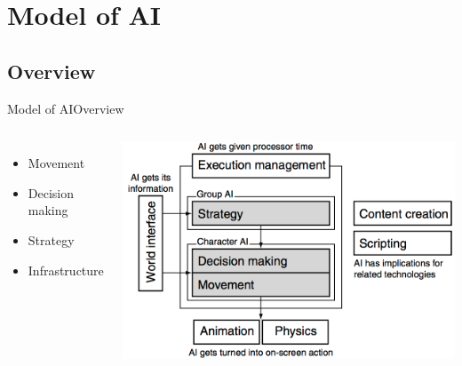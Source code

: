 \documentclass[10pt,compress]{beamer} %
\begin{document}
\section{Model of AI}
\subsection{Overview}
\begin{frame}{Model of AI}{Overview}
    \begin{columns}
		\begin{itemize}
		\item Movement
		\item Decision making
		\item Strategy
		\item Infrastructure
		\end{itemize}
		\centering\includegraphics[width=\linewidth]{figs/aimodel}\\

	\end{columns}
\end{frame}
\end{document}
